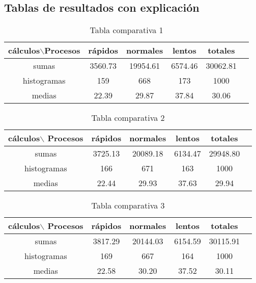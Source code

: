 \documentclass{article}
\begin{document}
\subsection{Tablas de resultados con explicación}
\begin{table}[H]
    \centering
    \caption{Tabla comparativa 1}
    \begin{tabular}{cccccc}
        \toprule
       cálculos$\backslash $Procesos & rápidos & normales & lentos & totales \\
        \midrule
    sumas &   3560.73       & 19954.61       & 6574.46       & 30062.81           \\
    histogramas &   159       & 668       & 173          & 1000            \\
    medias &   22.39       & 29.87       & 37.84         & 30.06            \\
        \bottomrule
    \end{tabular}
\end{table}
\begin{table}[H]
    \centering
    \caption{Tabla comparativa 2}
    \begin{tabular}{cccccc}
        \toprule
       cálculos$\backslash$ Procesos & rápidos & normales & lentos & totales \\
        \midrule
    sumas &   3725.13       & 20089.18       & 6134.47       & 29948.80           \\
    histogramas &   166       & 671       & 163          & 1000            \\
    medias &   22.44       & 29.93       & 37.63         & 29.94            \\
        \bottomrule
    \end{tabular}
\end{table}
\begin{table}[H]
    \centering
    \caption{Tabla comparativa 3}
    \begin{tabular}{cccccc}
        \toprule
       cálculos$\backslash$ Procesos & rápidos & normales & lentos & totales \\
        \midrule
    sumas &   3817.29       & 20144.03       & 6154.59       & 30115.91           \\
    histogramas &   169       & 667       & 164          & 1000            \\
    medias &   22.58       & 30.20       & 37.52         & 30.11            \\
        \bottomrule
    \end{tabular}
\end{table}
\end{document}
